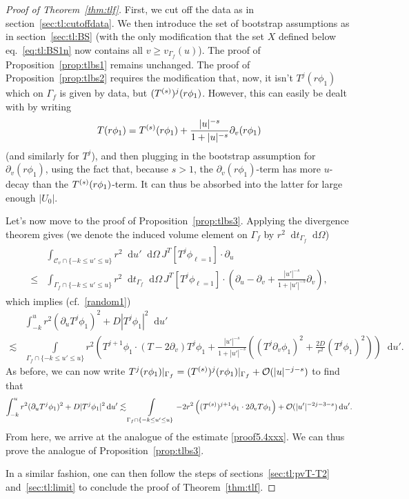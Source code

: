 \documentclass[11pt,english]{article}
\numberwithin{equation}{section}
\theoremstyle{remark}
\theoremstyle{plain}
\newenvironment{nalign}{
    \begin{equation}
    \begin{aligned}
}{
    \end{aligned}
    \end{equation}
    \ignorespacesafterend
}
\theoremstyle{remark}
\newcommand{\dd}{\mathop{}\!\mathrm{d}}
\newcommand{\pu}{\partial_u}
\newcommand{\pv}{\partial_v}
\renewcommand{\(}{\left(}
\renewcommand{\)}{\right)}
\newcommand{\pho}{(r\phi_1)}
\begin{document}
\begin{proof}[Proof of Theorem~\ref{thm:tlf}]
First, we cut off the data as in section~\ref{sec:tl:cutoffdata}. We then introduce the set of bootstrap assumptions as in section~\ref{sec:tl:BS} (with the only modification that the set $X$ defined below eq.\ \eqref{eq:tl:BS1n} now contains all $v\geq v_{\Gamma_f}(u)$). The proof of Proposition~\ref{prop:tlbs1} remains unchanged. The proof of Proposition~\ref{prop:tlbs2} requires the modification that, now, it isn't $T^j(r\phi_1)$ which on $\Gamma_f$ is given by data, but $(\te)^j\pho$.
However, this can easily be dealt with by writing
\begin{equation}
T(r\phi_1)=\te(r\phi_1)+\frac{|u|^{-s}}{1+|u|^{-s}}\pv(r\phi_1)
\end{equation}
(and similarly for $T^j$), and then plugging in the bootstrap assumption for $\pv(r\phi_1)$, using the fact that, because $s>1$, the $\pv(r\phi_1)$-term has more $u$-decay than the $T^{(s)}(r\phi_1)$-term. It can thus be absorbed into the latter for large enough $|U_0|$.

Let's now move to the proof of Proposition~\ref{prop:tlbs3}. Applying the divergence theorem gives (we denote the induced volume element on $\Gamma_f$ by $r^2\dd t_{\Gamma_f}\dd \Omega$)
\begin{align}
\begin{split}
&\int_{\mathcal{C}_{v}\cap\{-k\leq u'\leq u\}} r^2\dd u' \dd\Omega\, J^T[T^j\phi_{\ell=1}]\cdot \pu \\
\leq&\int_{\Gamma_f\cap\{-k\leq u'\leq u\}}  r^2 \dd t_{\Gamma_f}\dd \Omega	\,J^T[T^j\phi_{\ell=1}]\cdot\left(\pu-\pv+\frac{|u'|^{-s}}{1+|u'|^{-s}}\pv\right),
\end{split}
\end{align}
which implies (cf.\ \eqref{random1})
\begin{nalign}\label{random11}
&\int_{-k}^u r^2(\pu T^j\phi_{1})^2+D|T^j\phi_{1}|^2\dd u'	 \\
\lesssim &\int\limits_{\Gamma_f\cap\{-k\leq u'\leq u\}}  r^2 \left(T^{j+1}\phi_{1}\cdot (T-2\pv)T^j \phi_{1}+\frac{|u'|^{-s}}{1+|u'|^{-s}}\left((T^j \pv \phi_1)^2+\frac{2D}{r^2}(T^j\phi_1)^2\right)	\right) \dd u'.
\end{nalign}
As before, we can now write 
$
T^j(r\phi_1)|_{\Gamma_f}=(T^{(s)})^{j}(r\phi_1)|_{\Gamma_f}+\mathcal{O}(|u|^{-j-s})
$
to find that
\begin{multline*}
\int_{-k}^u r^2(\pu T^j\phi_{1})^2+D|T^j\phi_{1}|^2\dd u'	
\lesssim \int\limits_{\Gamma_f\cap\{-k\leq u'\leq u\}}  -2r^2 \left((\te)^{j+1}\phi_{1}\cdot 2\pv T \phi_{1}	\right) +\mathcal{O}(|u'|^{-2j-3-s})\dd u'.
\end{multline*}
From here, we arrive at the analogue of the estimate \eqref{proof5.4xxx}. We can thus prove the analogue of Proposition~\ref{prop:tlbs3}. 

In a similar fashion, one can then follow the steps of sections~\ref{sec:tl:pvT-T2} and~\ref{sec:tl:limit} to conclude the proof of Theorem~\ref{thm:tlf}.
\end{proof}
\end{document}
